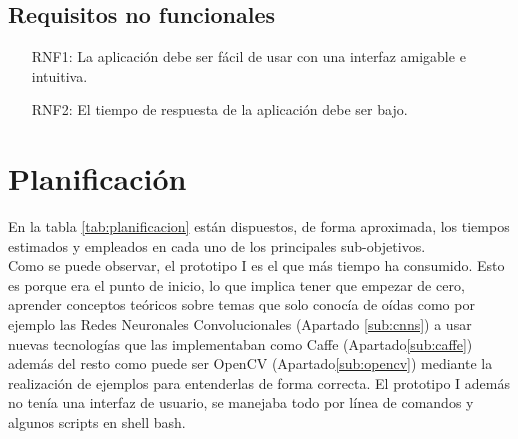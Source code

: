 \documentclass[a4paper,11pt]{book}
\begin{document}
\subsection{Requisitos no funcionales}
\begin{itemize}
	\item [RNF1:] La aplicación debe ser fácil de usar con una interfaz amigable e intuitiva.
	\item [RNF2:] El tiempo de respuesta de la aplicación debe ser bajo.	
\end{itemize}

\section{Planificación}



En la tabla \ref{tab:planificacion} están dispuestos, de forma aproximada, los tiempos estimados y empleados en cada uno de los principales sub-objetivos. \\
Como se puede observar, el prototipo I es el que más tiempo ha consumido. Esto es porque era el punto de inicio, lo que implica tener que empezar de cero, aprender conceptos teóricos sobre temas que solo conocía de oídas como por ejemplo las Redes Neuronales Convolucionales (Apartado \ref{sub:cnns}) a usar nuevas tecnologías que las implementaban como Caffe (Apartado\ref{sub:caffe}) además del resto como puede ser OpenCV (Apartado\ref{sub:opencv}) mediante la realización de ejemplos para entenderlas de forma correcta. El prototipo I además no tenía una interfaz de usuario, se manejaba todo por línea de comandos y algunos scripts en shell bash.\\
\end{document}
